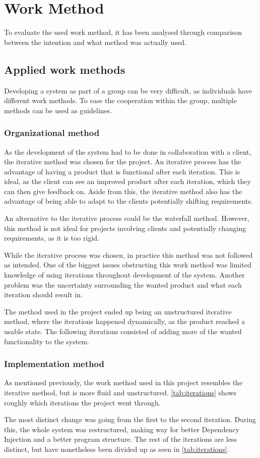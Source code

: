 \chapter{Work Method}\label{ch:workMethod}
To evaluate the used work method, it has been analysed through comparison between the intention and what method was actually used.

\section{Applied work methods}
Developing a system as part of a group can be very difficult, as individuals have different work methods. To ease the cooperation within the group, multiple methods can be used as guidelines.

\subsection{Organizational method}
As the development of the system had to be done in collaboration with a client, the iterative method was chosen for the project. An iterative process has the advantage of having a product that is functional after each iteration. This is ideal, as the client can see an improved product after each iteration, which they can then give feedback on. Aside from this, the iterative method also has the advantage of being able to adapt to the clients potentially shifting requirements. \citep{SDLC}
\par
An alternative to the iterative process could be the waterfall method. However, this method is not ideal for projects involving clients and potentially changing requirements, as it is too rigid. \citep{SDLC, WaterfallVsAgile}
\par
While the iterative process was chosen, in practice this method was not followed as intended. One of the biggest issues obstructing this work method was limited knowledge of using iterations throughout development of the system. Another problem was the uncertainty surrounding the wanted product and what each iteration should result in.
\par 
The method used in the project ended up being an unstructured iterative method, where the iterations happened dynamically, as the product reached a usable state. The following iterations consisted of adding more of the wanted functionality to the system.

\subsection{Implementation method}
As mentioned previously, the work method used in this project resembles the iterative method, but is more fluid and unstructured. \autoref{tab:iterations} shows roughly which iterations the project went through.
\par
The most distinct change was going from the first to the second iteration. During this, the whole system was restructured, making way for better Dependency Injection and a better program structure. The rest of the iterations are less distinct, but have nonetheless been divided up as seen in \autoref{tab:iterations}. 

